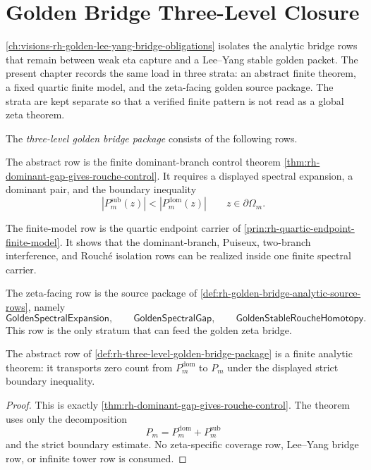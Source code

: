 \chapter{Golden Bridge Three-Level Closure}
\label{ch:visions-rh-golden-bridge-three-level-closure}

\autoref{ch:visions-rh-golden-lee-yang-bridge-obligations} isolates
the analytic bridge rows that remain between weak eta capture and a
Lee--Yang stable golden packet.  The present chapter records the same
load in three strata: an abstract finite theorem, a fixed quartic finite
model, and the zeta-facing golden source package.  The strata are kept
separate so that a verified finite pattern is not read as a global zeta
theorem.

\begin{definition}
\label{def:rh-three-level-golden-bridge-package}
The \emph{three-level golden bridge package} consists of the following
rows.

The abstract row is the finite dominant-branch control theorem
\autoref{thm:rh-dominant-gap-gives-rouche-control}.  It requires a
displayed spectral expansion, a dominant pair, and the boundary
inequality
$$
|P_m^{\mathrm{sub}}(z)|<|P_m^{\mathrm{dom}}(z)|
\qquad
z\in\partial\Omega_m.
$$

The finite-model row is the quartic endpoint carrier of
\autoref{prin:rh-quartic-endpoint-finite-model}.  It shows that the
dominant-branch, Puiseux, two-branch interference, and Rouch\'e
isolation rows can be realized inside one finite spectral carrier.

The zeta-facing row is the source package of
\autoref{def:rh-golden-bridge-analytic-source-rows}, namely
$$
\mathsf{GoldenSpectralExpansion},
\qquad
\mathsf{GoldenSpectralGap},
\qquad
\mathsf{GoldenStableRoucheHomotopy}.
$$
This row is the only stratum that can feed the golden zeta bridge.
\end{definition}

\begin{theorem}
\label{thm:rh-abstract-dominant-control-is-finite}
The abstract row of
\autoref{def:rh-three-level-golden-bridge-package} is a finite analytic
theorem: it transports zero count from $P_m^{\mathrm{dom}}$ to $P_m$
under the displayed strict boundary inequality.
\end{theorem}

\begin{proof}
This is exactly \autoref{thm:rh-dominant-gap-gives-rouche-control}.
The theorem uses only the decomposition
$$
P_m=P_m^{\mathrm{dom}}+P_m^{\mathrm{sub}}
$$
and the strict boundary estimate.  No zeta-specific coverage row,
Lee--Yang bridge row, or infinite tower row is consumed.
\end{proof}

